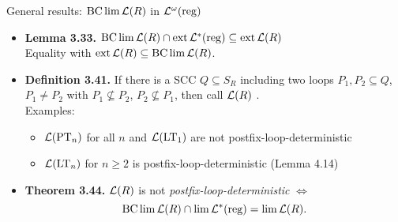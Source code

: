 \documentclass[
	notheorems,noamsthm]{beamer}
\begin{document}
\begin{frame}[<+->]{General results: $\operatorname{BC} \lim \mathcal{L}(R)$ in $\mathcal{L}^\omega(\textup{\textrm{reg}})$}
\begin{itemize}
\item \textbf{Lemma 3.33.} $\operatorname{BC} \lim \mathcal{L}(R) \cap \operatorname{ext} \mathcal{L}^*(\textup{\textrm{reg}}) \subseteq \operatorname{ext} \mathcal{L}(R)$ \\
Equality with $\operatorname{ext} \mathcal{L}(R) \subseteq \operatorname{BC} \lim \mathcal{L}(R)$.
\item \textbf{Definition 3.41.} If there is a SCC $Q \subseteq S_R$ including two loops $P_1,P_2 \subseteq Q$, $P_1 \neq P_2$ with $P_1 \not\subseteq P_2$, $P_2 \not\subseteq P_1$, then call $\mathcal{L}(R)$ . \\
Examples:
\begin{itemize}
\item $\mathcal{L}(\textup{\textrm{PT}}_n)$ for all $n$ and $\mathcal{L}(\textup{\textrm{LT}}_1)$ are not postfix-loop-deterministic
\item $\mathcal{L}(\textup{\textrm{LT}}_n)$ for $n \ge 2$ is postfix-loop-deterministic (Lemma 4.14)
\end{itemize}
\item \textbf{Theorem 3.44.} $\mathcal{L}(R)$ is not \emph{postfix-loop-deterministic} $\Leftrightarrow$
\[ \operatorname{BC} \lim \mathcal{L}(R) \cap \lim \mathcal{L}^*(\textup{\textrm{reg}}) = \lim \mathcal{L}(R) . \]
\end{itemize}
\end{frame}
\end{document}
